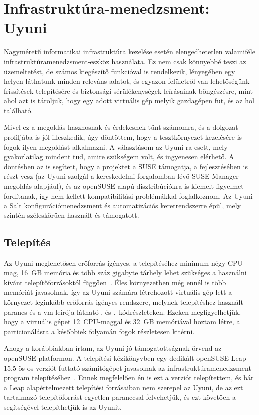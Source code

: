 
\chapter{Infrastruktúra-menedzsment: Uyuni}
\label{chap:uyuni}
Nagyméretű informatikai infrastruktúra kezelése esetén elengedhetetlen valamiféle infrastruktúramenedzsment-eszköz használata. Ez nem csak könnyebbé teszi az üzemeltetést, de számos kiegészítő funkcióval is rendelkezik, lényegében egy helyen láthatunk minden releváns adatot, és egyazon felületről van lehetőségünk frissítések telepítésére és biztonsági sérülékenységek leírásainak böngészésre, mint ahol azt is tároljuk, hogy egy adott virtuális gép melyik gazdagépen fut, és az hol található.

Mivel ez a megoldás hasznosnak és érdekesnek tűnt számomra, és a dolgozat profiljába is jól illeszkedik, úgy döntöttem, hogy a tesztkörnyezet kezelésére is fogok ilyen megoldást alkalmazni. A választásom az Uyuni-ra esett, mely gyakorlatilag mindent tud, amire szükségem volt, és ingyenesen elérhető. A döntésben az is segített, hogy a projektet a SUSE támogatja, a fejlesztésében is részt vesz (az Uyuni szolgál a kereskedelmi forgalomban lévő SUSE Manager megoldás alapjául), és az openSUSE-alapú disztribúciókra is kiemelt figyelmet fordítanak, így nem kellett kompatibilitási problémákkal foglalkoznom. Az Uyuni a Salt konfigurációmenedzsment és automatizációs keretrendszerre épül, mely szintén széleskörűen használt és támogatott.


\section{Telepítés}
\label{sect:uyuni-install}
Az Uyuni meglehetősen erőforrás-igényes, a telepítéséhez minimum négy CPU-mag, 16~GB memória és  több száz gigabyte tárhely lehet szükséges a használni kívánt telepítőforrásoktól függően~\cite{UyuniInstallGuide}. Éles környezetben még ennél is több memóriát javasolnak, így az Uyuni számára létrehozott virtuális gép lett a környezet leginkább erőforrás-igényes rendszere, melynek telepítéshez használt parancs és a \acrshort{vm} leírója látható . és .~kódrészleteken. Ezeken megfigyelhetjük, hogy a virtuális gépet 12~CPU-maggal és 32~GB memóriával hoztam létre, a particionálásra a későbbiek folyamán fogok részletesen kitérni.

Ahogy a korábbiakban írtam, az Uyuni jó támogatottságnak örvend az openSUSE platformon. A telepítési kézikönyvben egy dedikált openSUSE Leap 15.5-ös \acrshort{os}-verziót futtató számítógépet javasolnak az infrastruktúramenedzsment-program telepítéséhez~\cite{UyuniInstallGuide}.
Ennek megfelelően én is ezt a verziót telepítettem, és bár a Leap alapértelmezett telepítési forrásaiban nem szerepel az Uyuni, de az ezt tartalmazó telepítőforrást egyetlen paranccsal felvehetjük, és ezt követően a segítségével telepíthetjük is az Uyunit.

